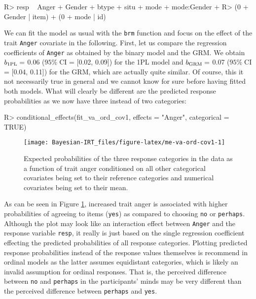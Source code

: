 \documentclass[
]{jss}
\begin{document}
\begin{CodeChunk}

\begin{CodeInput}
R> resp ~ Anger + Gender + btype + situ + mode + mode:Gender +
R>   (0 + Gender | item) + (0 + mode | id)
\end{CodeInput}
\end{CodeChunk}

We can fit the model as usual with the \texttt{brm} function and focus
on the effect of the trait \texttt{Anger} covariate in the following.
First, let us compare the regression coefficients of \texttt{Anger} as
obtained by the binary model and the GRM. We obtain \(b_{\rm 1PL} =\)
0.06 (\(95\% \; \text{CI}\) = {[}0.02, 0.09{]}) for the 1PL model and
\(b_{\rm GRM} =\) 0.07 (\(95\% \; \text{CI}\) = {[}0.04, 0.11{]}) for
the GRM, which are actually quite similar. Of course, this it not
necessarily true in general and we cannot know for sure before having
fitted both models. What will clearly be different are the predicted
response probabilities as we now have three instead of two categories:

\begin{CodeChunk}

\begin{CodeInput}
R> conditional_effects(fit_va_ord_cov1, effects = "Anger", categorical = TRUE)
\end{CodeInput}
\begin{figure}

{\centering \texttt{[image: Bayesian-IRT\_files/figure-latex/me-va-ord-cov1-1]} 

}

\caption[Expected probabilities of the three response categories in the  data as a function of trait anger conditioned on all other categorical covariates being set to their reference categories and numerical covariates being set to their mean]{Expected probabilities of the three response categories in the  data as a function of trait anger conditioned on all other categorical covariates being set to their reference categories and numerical covariates being set to their mean.}\label{fig:me-va-ord-cov1}
\end{figure}
\end{CodeChunk}

As can be seen in Figure \ref{fig:me-va-ord-cov1}, increased trait anger
is associated with higher probabilities of agreeing to items
(\texttt{yes}) as compared to choosing \texttt{no} or \texttt{perhaps}.
Although the plot may look like an interaction effect between
\texttt{Anger} and the response variable \texttt{resp}, it really is
just based on the single regression coefficient effecting the predicted
probabilities of all response categories. Plotting predicted response
probabilities instead of the response values themselves is recommend in
ordinal models as the latter assumes equidistant categories, which is
likely an invalid assumption for ordinal responses. That is, the
perceived difference between \texttt{no} and \texttt{perhaps} in the
participants' minds may be very different than the perceived difference
between \texttt{perhaps} and \texttt{yes}.
\end{document}
